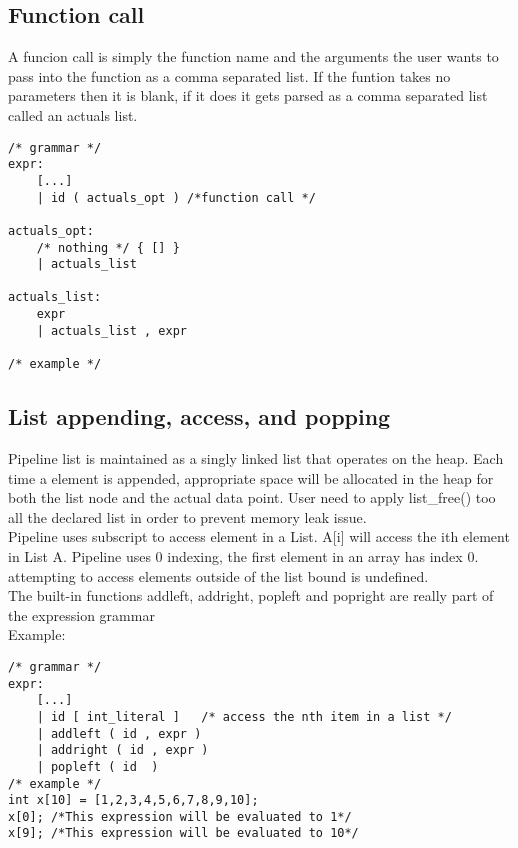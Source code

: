 \documentclass[./Report_main.tex]{subfiles}
\begin{document}
\subsection{Function call}
A funcion call is simply the function name and the arguments the user wants to pass into the function as a comma separated list. If the funtion takes no parameters then it is blank, if it does it gets parsed as a comma separated list called an actuals list.
\begin{lstlisting}
/* grammar */
expr:
	[...]
    | id ( actuals_opt ) /*function call */
    
actuals_opt:
    /* nothing */ { [] }
    | actuals_list

actuals_list:
    expr
    | actuals_list , expr

/* example */

\end{lstlisting}
\subsection{List appending, access, and popping}
Pipeline list is maintained as a singly linked list that operates on the heap. Each time a element is appended, appropriate space will be allocated in the heap for both the list node and the actual data point. User need to apply list\_free() too all the declared list in order to prevent memory leak issue.\\   
Pipeline uses subscript to access element in a List. A[i] will access the ith element in List A. Pipeline uses 0 indexing, the first element in an array has index 0.\\
attempting to access elements outside of the list bound is undefined.\\
The built-in functions addleft, addright, popleft and popright  are really part of the expression grammar
\pagebreak\\
Example:
\begin{lstlisting}
/* grammar */
expr:
	[...]
    | id [ int_literal ]   /* access the nth item in a list */ 
    | addleft ( id , expr )  
    | addright ( id , expr ) 
    | popleft ( id  ) 
/* example */
int x[10] = [1,2,3,4,5,6,7,8,9,10];
x[0]; /*This expression will be evaluated to 1*/
x[9]; /*This expression will be evaluated to 10*/
\end{lstlisting}
\end{document}
